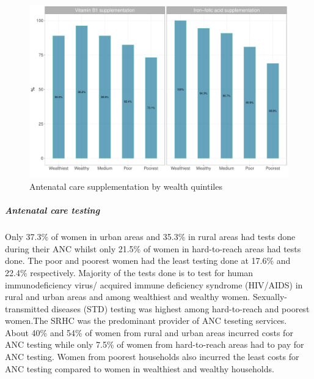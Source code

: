 \documentclass[12pt,a4paper]{article}
\let\oldsubparagraph\subparagraph
\renewcommand{\subparagraph}[1]{\oldsubparagraph{#1}\mbox{}}
\begin{document}
\begin{figure}[H]

{\centering \includegraphics{kayahReport_files/figure-latex/anc4Plot-1} 

}

\caption{Antenatal care supplementation by wealth quintiles}\label{fig:anc4Plot}
\end{figure}

\hypertarget{ancTesting}{%
\subparagraph{Antenatal care testing}\label{ancTesting}}

Only 37.3\% of women in urban areas and 35.3\% in rural areas had tests done during their ANC whilst only 21.5\% of women in hard-to-reach areas had tests done. The poor and poorest women had the least testing done at 17.6\% and 22.4\% respectively. Majority of the tests done is to test for human immunodeficiency virus/ acquired immune deficiency syndrome (HIV/AIDS) in rural and urban areas and among wealthiest and wealthy women. Sexually-transmitted diseases (STD) testing was highest among hard-to-reach and poorest women.The SRHC was the predominant provider of ANC teseting services. About 40\% and 54\% of women from rural and urban areas incurred costs for ANC testing while only 7.5\% of women from hard-to-reach areas had to pay for ANC testing. Women from poorest households also incurred the least costs for ANC testing compared to women in wealthiest and wealthy households.
\end{document}
